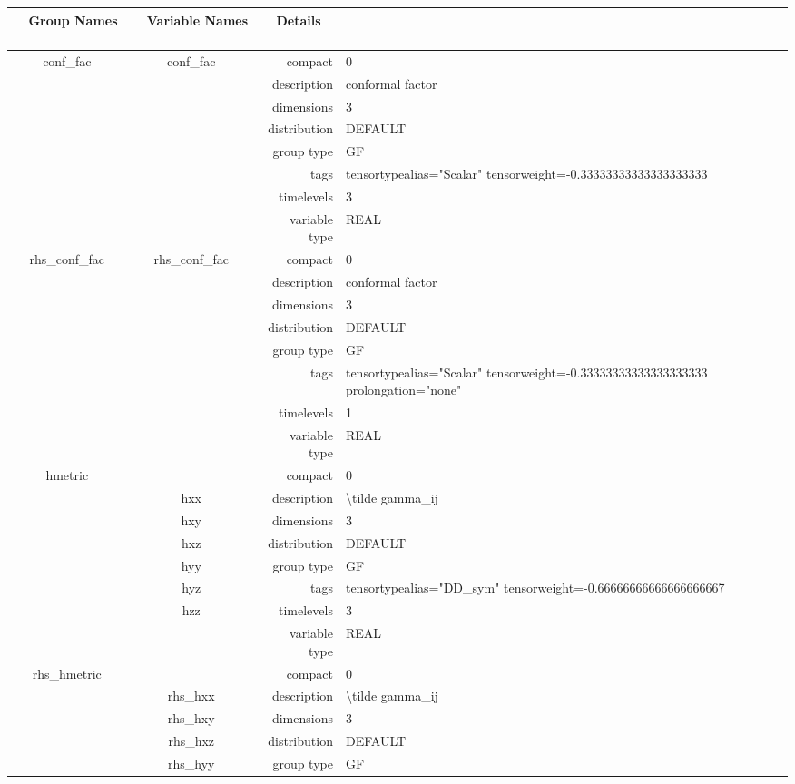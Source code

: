 \vspace{5mm}

\begin{tabular*}{150mm}{|c|c@{\extracolsep{\fill}}|rl|} \hline 
~ {\bf Group Names} ~ & ~ {\bf Variable Names} ~  &{\bf Details} ~ & ~\\ 
\hline 
conf\_fac & conf\_fac & compact & 0 \\ 
 &  & description & conformal factor \\ 
 &  & dimensions & 3 \\ 
 &  & distribution & DEFAULT \\ 
 &  & group type & GF \\ 
 &  & tags & tensortypealias="Scalar" tensorweight=-0.33333333333333333333 \\ 
 &  & timelevels & 3 \\ 
 &  & variable type & REAL \\ 
\hline 
rhs\_conf\_fac & rhs\_conf\_fac & compact & 0 \\ 
 &  & description & conformal factor \\ 
 &  & dimensions & 3 \\ 
 &  & distribution & DEFAULT \\ 
 &  & group type & GF \\ 
 &  & tags & tensortypealias="Scalar" tensorweight=-0.33333333333333333333 prolongation="none" \\ 
 &  & timelevels & 1 \\ 
 &  & variable type & REAL \\ 
\hline 
hmetric &  & compact & 0 \\ 
 & hxx & description & {\textbackslash}tilde gamma\_ij \\ 
 & hxy & dimensions & 3 \\ 
 & hxz & distribution & DEFAULT \\ 
 & hyy & group type & GF \\ 
 & hyz & tags & tensortypealias="DD\_sym" tensorweight=-0.66666666666666666667 \\ 
 & hzz & timelevels & 3 \\ 
 &  & variable type & REAL \\ 
\hline 
rhs\_hmetric &  & compact & 0 \\ 
 & rhs\_hxx & description & {\textbackslash}tilde gamma\_ij \\ 
 & rhs\_hxy & dimensions & 3 \\ 
 & rhs\_hxz & distribution & DEFAULT \\ 
 & rhs\_hyy & group type & GF \\ 

\end{tabular*}
